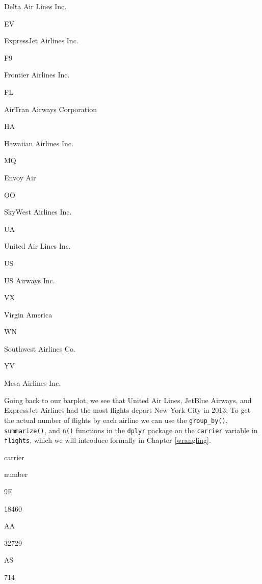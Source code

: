 \documentclass[12pt,]{krantz}
\makeatletter
\newenvironment{Shaded}{\begin{snugshade}}{\end{snugshade}}
\newcommand{\KeywordTok}[1]{\textcolor[rgb]{0.27,0.27,0.27}{\textbf{#1}}}
\newcommand{\DataTypeTok}[1]{\textcolor[rgb]{0.27,0.27,0.27}{#1}}
\newcommand{\StringTok}[1]{\textcolor[rgb]{0.5,0.5,0.5}{#1}}
\newcommand{\OperatorTok}[1]{\textcolor[rgb]{0.43,0.43,0.43}{\textbf{#1}}}
\newcommand{\NormalTok}[1]{#1}
\newenvironment{kframe}{%
\medskip{}
\setlength{\fboxsep}{.8em}
 \def\at@end@of@kframe{}%
 \ifinner\ifhmode%
  \def\at@end@of@kframe{\end{minipage}}%
  \begin{minipage}{\columnwidth}%
 \fi\fi%
 \def\FrameCommand##1{\hskip\@totalleftmargin \hskip-\fboxsep
 \colorbox{shadecolor}{##1}\hskip-\fboxsep
     \hskip-\linewidth \hskip-\@totalleftmargin \hskip\columnwidth}%
 \MakeFramed {\advance\hsize-\width
   \@totalleftmargin\z@ \linewidth\hsize
   \@setminipage}}%
 {\par\unskip\endMakeFramed%
 \at@end@of@kframe}
\renewenvironment{Shaded}{\begin{kframe}}{\end{kframe}}
\makeatother
\begin{document}
Delta Air Lines Inc.

EV

ExpressJet Airlines Inc.

F9

Frontier Airlines Inc.

FL

AirTran Airways Corporation

HA

Hawaiian Airlines Inc.

MQ

Envoy Air

OO

SkyWest Airlines Inc.

UA

United Air Lines Inc.

US

US Airways Inc.

VX

Virgin America

WN

Southwest Airlines Co.

YV

Mesa Airlines Inc.

Going back to our barplot, we see that United Air Lines, JetBlue
Airways, and ExpressJet Airlines had the most flights depart New York
City in 2013. To get the actual number of flights by each airline we can
use the \texttt{group\_by()}, \texttt{summarize()}, and \texttt{n()}
functions in the \texttt{dplyr} package on the \texttt{carrier} variable
in \texttt{flights}, which we will introduce formally in Chapter
\ref{wrangling}.

\begin{Shaded}
\end{Shaded}

carrier

number

9E

18460

AA

32729

AS

714
\end{document}

